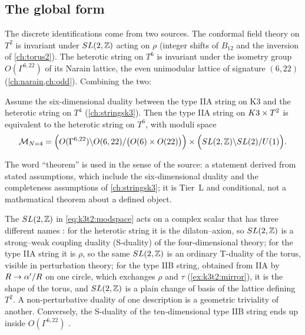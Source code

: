 \subsection{The global form}
The discrete identifications come from two sources. The conformal field theory on $T^2$ is
invariant under $SL(2,\mathbb{Z})$ acting on $\rho$ (integer shifts of $B_{12}$ and the inversion of
\cref{ch:torus2}). The heterotic string on $T^6$ is invariant under the isometry group
$O(\Gamma^{6,22})$ of its Narain lattice, the even unimodular lattice of
signature $(6,22)$ (\cref{ch:narain,ch:odd}). Combining the two:

\begin{theorem}\label{thm:k3t2:modspace}
Assume the six-dimensional duality between the type IIA string on K3 and the heterotic string
on $T^4$ (\cref{ch:stringsk3}). Then the type IIA string on $K3\times T^2$ is equivalent to the
heterotic string on $T^6$, with moduli space
\begin{equation}\label{eq:k3t2:modspace}
 \mathcal M_{N=4}=\Bigl(O(\Gamma^{6,22})\backslash O(6,22)/\bigl(O(6)\times O(22)\bigr)\Bigr)
 \times\Bigl(SL(2,\mathbb{Z})\backslash SL(2)/U(1)\Bigr).
\end{equation}
\end{theorem}

The word ``theorem'' is used in the sense of the source: a statement derived from stated
assumptions, which include the six-dimensional duality and the completeness assumptions of
\cref{ch:stringsk3}; it is Tier~L and conditional, not a mathematical theorem about a defined
object.

\begin{physicsbox}
The $SL(2,\mathbb{Z})$ in \eqref{eq:k3t2:modspace} acts on a complex scalar that has three different
names : for the heterotic string it is the dilaton--axion,
so $SL(2,\mathbb{Z})$ is a strong--weak coupling duality (S-duality) of the
four-dimensional theory; for the type IIA string it is $\rho$, so the same $SL(2,\mathbb{Z})$ is an
ordinary T-duality of the torus, visible in perturbation theory; for the type IIB string,
obtained from IIA by $R\to\alpha'/R$ on one circle, which exchanges $\rho$ and $\tau$
(\cref{ex:k3t2:mirror}), it is the shape of the torus, and $SL(2,\mathbb{Z})$ is a plain change of basis
of the lattice defining $T^2$. A non-perturbative duality of one description is a geometric
triviality of another. Conversely, the S-duality of the ten-dimensional type IIB string ends
up inside $O(\Gamma^{6,22})$ .
\end{physicsbox}

